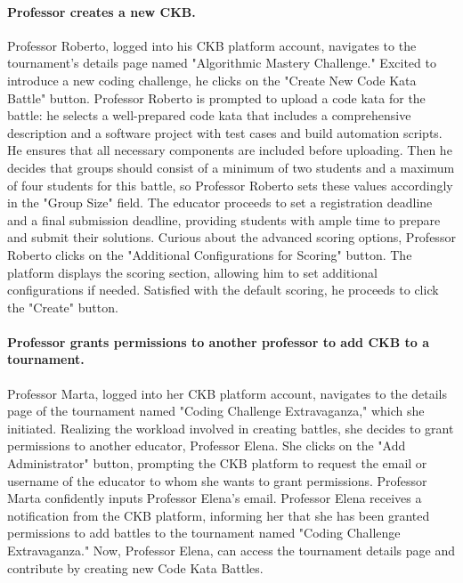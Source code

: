 \paragraph*{Professor creates a new CKB.}
Professor Roberto, logged into his CKB platform account, navigates to the tournament's details page named "Algorithmic Mastery Challenge." 
Excited to introduce a new coding challenge, he clicks on the "Create New Code Kata Battle" button. 
Professor Roberto is prompted to upload a code kata for the battle: he selects a well-prepared code kata that includes a comprehensive description and a software project with test cases and build automation scripts. 
He ensures that all necessary components are included before uploading.
Then he decides that groups should consist of a minimum of two students and a maximum of four students for this battle, so Professor Roberto sets these values accordingly in the "Group Size" field.
The educator proceeds to set a registration deadline and a final submission deadline, providing students with ample time to prepare and submit their solutions.
Curious about the advanced scoring options, Professor Roberto clicks on the "Additional Configurations for Scoring" button. 
The platform displays the scoring section, allowing him to set additional configurations if needed. 
Satisfied with the default scoring, he proceeds to click the "Create" button.

\paragraph*{Professor grants permissions to another professor to add CKB to a tournament.}
Professor Marta, logged into her CKB platform account, navigates to the details page of the tournament named "Coding Challenge Extravaganza," which she initiated. 
Realizing the workload involved in creating battles, she decides to grant permissions to another educator, Professor Elena.
She clicks on the "Add Administrator" button, prompting the CKB platform to request the email or username of the educator to whom she wants to grant permissions. 
Professor Marta confidently inputs Professor Elena's email.
Professor Elena receives a notification from the CKB platform, informing her that she has been granted permissions to add battles to the tournament named "Coding Challenge Extravaganza."
Now, Professor Elena, can access the tournament details page and contribute by creating new Code Kata Battles. 

